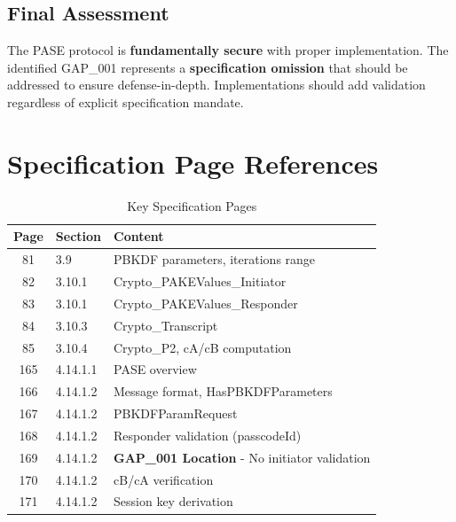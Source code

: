 \documentclass[11pt,a4paper]{article}
\begin{document}
\subsection{Final Assessment}

The PASE protocol is \textbf{fundamentally secure} with proper implementation. The identified GAP\_001 represents a \textbf{specification omission} that should be addressed to ensure defense-in-depth. Implementations should add validation regardless of explicit specification mandate.

\begin{center}
\end{center}

\appendix
\section{Specification Page References}

\begin{table}[H]
\centering
\caption{Key Specification Pages}
\begin{tabular}{|c|l|l|}
\hline
\rowcolor{lightgray}
\textbf{Page} & \textbf{Section} & \textbf{Content} \\
\hline
81 & 3.9 & PBKDF parameters, iterations range \\
\hline
82 & 3.10.1 & Crypto\_PAKEValues\_Initiator \\
\hline
83 & 3.10.1 & Crypto\_PAKEValues\_Responder \\
\hline
84 & 3.10.3 & Crypto\_Transcript \\
\hline
85 & 3.10.4 & Crypto\_P2, cA/cB computation \\
\hline
165 & 4.14.1.1 & PASE overview \\
\hline
166 & 4.14.1.2 & Message format, HasPBKDFParameters \\
\hline
167 & 4.14.1.2 & PBKDFParamRequest \\
\hline
\rowcolor{gapyellow!20}
168 & 4.14.1.2 & Responder validation (passcodeId) \\
\hline
\rowcolor{criticalred!20}
169 & 4.14.1.2 & \textbf{GAP\_001 Location} - No initiator validation \\
\hline
170 & 4.14.1.2 & cB/cA verification \\
\hline
171 & 4.14.1.2 & Session key derivation \\
\hline
\end{tabular}
\end{table}
\end{document}
